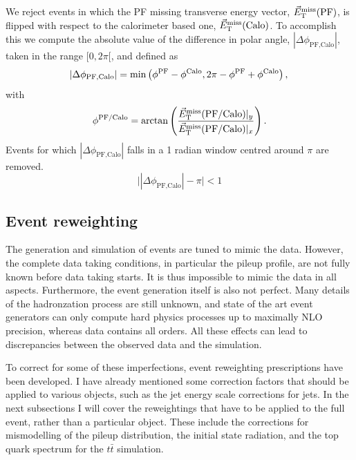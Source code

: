 We reject events in which the PF missing transverse energy vector, ${\vec E}_{\mathrm{T}}^{\text{miss}}(\text{PF})$, is
flipped with respect to the calorimeter based one, ${\vec E}_{\mathrm{T}}^{\text{miss}}(\text{Calo})$. 
To accomplish this we compute the absolute value of the difference in polar angle,
 $|\Delta\phi_{\text{PF,Calo}}|$, taken in the range $[0,2\pi[$, and defined as
\begin{equation}
|\Delta\phi_{\text{PF,Calo}}| = \min \left ( \phi^{\text{PF}} - \phi^{\text{Calo}},   2\pi -
\phi^{\text{PF}} + \phi^{\text{Calo}} \right) ,\\
\end{equation}
with 
\begin{equation}
\phi^{\text{PF/Calo}} = \textrm{arctan} \left( \frac{{\vec E}_{\mathrm{T}}^{\text{miss}}(\text{PF/Calo})|_y}
{{\vec E}_{\mathrm{T}}^{\text{miss}}(\text{PF/Calo})|_x} \right) . \\
\end{equation}
Events for which $|\Delta\phi_{\text{PF,Calo}}|$ falls in a 1 radian window centred around $\pi$
are removed. 
\begin{equation}
\bigl| |\Delta\phi_{\text{PF,Calo}}| - \pi \bigr| < 1
\label{eqn:dphicut}
\end{equation}


\subsection{Event reweighting \label{sec:event_reweighting}}

The generation and simulation of events are tuned to mimic the data. However, the complete data
taking conditions, in particular the pileup profile, are not fully known before data
taking starts. It is thus impossible to mimic the data in all aspects. 
Furthermore, the event generation itself is also not perfect. 
Many details of the hadronzation process are still unknown, and state of the art event
generators can only compute hard physics processes up to maximally NLO precision,
whereas data contains all orders.  
All these effects can lead to discrepancies between the observed data and the simulation.  

To correct for some of these imperfections, event reweighting prescriptions have been developed. I
have already mentioned some correction factors that should be applied to various objects, such as
the jet energy scale corrections for jets. 
In the next subsections I will cover the reweightings that have to be applied to the full event,
rather than a particular object. These include the corrections for mismodelling of the pileup
distribution, the initial state radiation, and the top quark \pt spectrum for the
$t\bar{t}$ simulation.


